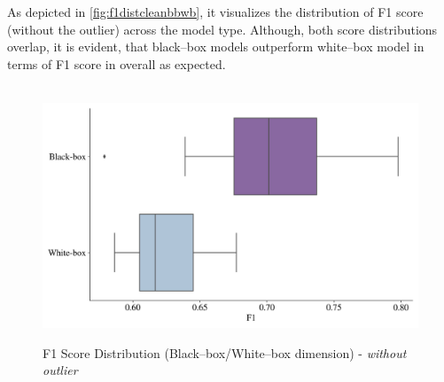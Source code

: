 As depicted in \autoref{fig:f1distcleanbbwb}, it visualizes the distribution of F1 score (without the outlier) across the model type. Although, both score distributions overlap, it is evident, that black--box models outperform white--box model in terms of F1 score in overall as expected.
\begin{figure}[H]
    \centering
    \caption{F1 Score Distribution (Black--box/White--box dimension) - \textit{without outlier}}\vspace{0.5em}
    \label{fig:f1distcleanbbwb}\
    \includegraphics[width=140mm]{Figures/F1_wo_outliers_Distribution_BB_WB.jpg}

    \vspace{-1em}
\end{figure}


